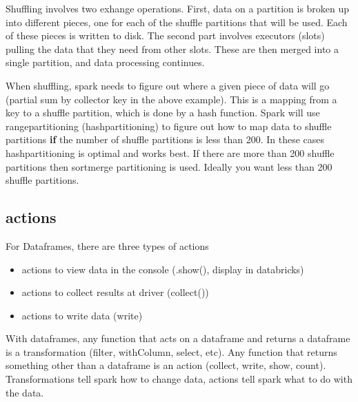 \documentclass{article}
\begin{document}
Shuffling involves two exhange operations. First, data on a partition is broken up into different pieces, one for each of the shuffle partitions that will be used. Each of these pieces is written to disk. The second part involves executors (slots) pulling the data that they need from other slots. These are then merged into a single partition, and data processing continues. 

When shuffling, spark needs to figure out where a given piece of data will go (partial sum by collector key in the above example). This is a mapping from a key to a shuffle partition, which is done by a hash function. Spark will use rangepartitioning (hashpartitioning) to figure out how to map data to shuffle partitions {\bf if} the number of shuffle partitions is less than 200. In these cases hashpartitioning is optimal and works best. If there are more than 200 shuffle partitions then sortmerge partitioning is used. Ideally you want less than 200 shuffle partitions.






\subsection{actions}
For Dataframes, there are three types of actions
\begin{itemize}
\item actions to view data in the console (.show(), display in databricks)
\item actions to collect results at driver (collect())
\item actions to write data (write)
\end{itemize}

With dataframes, any function that acts on a dataframe and returns a dataframe is a transformation (filter, withColumn, select, etc). Any function that returns something other than a dataframe is an action (collect, write, show, count). Transformations tell spark how to change data, actions tell spark what to do with the data. 

\end{document}
